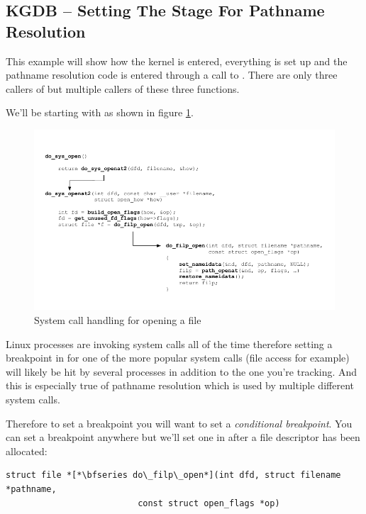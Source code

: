 
\subsection{KGDB -- Setting The Stage For Pathname Resolution}

This example will show how the kernel is entered, everything is set up and the pathname resolution code is entered through a call to . There are only three callers of  but multiple callers of these three functions.

We'll be starting with  as shown in figure \ref{fig:kgdb-path}.

\begin{figure}[h]
	\includegraphics[scale=0.95]{figures/kgdb-path.pdf}
	\centering
	\caption{System call handling for opening a file}
	\label{fig:kgdb-path}
\end{figure}

Linux processes are invoking system calls all of the time therefore setting a breakpoint in  for one of the more popular system calls (file access for example) will likely be hit by several processes in addition to the one you're tracking. And this is especially true of pathname resolution which is used by multiple different system calls.

Therefore to set a breakpoint you will want to set a \textit{conditional breakpoint}. You can set a breakpoint anywhere but we'll set one in  after a file descriptor has been allocated:

\begin{lstlisting}
struct file *[*\bfseries do\_filp\_open*](int dfd, struct filename *pathname,
                          const struct open_flags *op)
\end{lstlisting}

